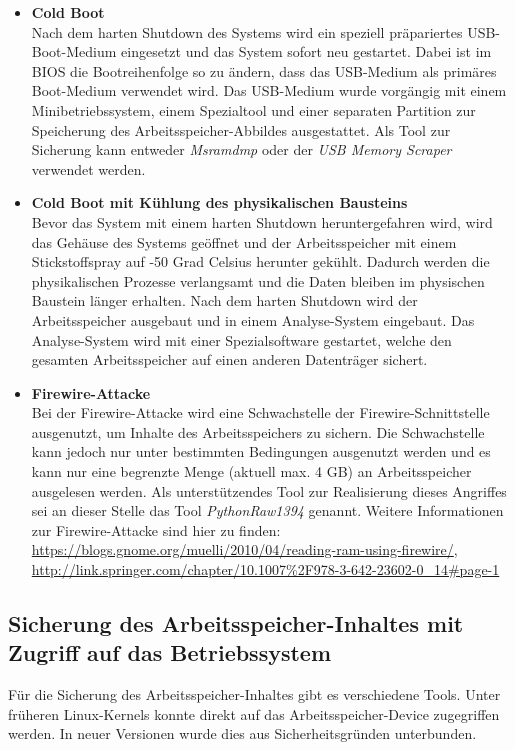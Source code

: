 \begin{itemize}
\item \textbf{Cold Boot}\\
Nach dem harten Shutdown des Systems wird ein speziell präpariertes USB-Boot-Medium eingesetzt und das System sofort neu gestartet. Dabei ist im BIOS die Bootreihenfolge so zu ändern, dass das USB-Medium als primäres Boot-Medium verwendet wird. Das USB-Medium wurde vorgängig mit einem Minibetriebssystem, einem Spezialtool und einer separaten Partition zur Speicherung des Arbeitsspeicher-Abbildes ausgestattet. Als Tool zur Sicherung kann entweder \textit{Msramdmp} oder der \textit{USB Memory Scraper} verwendet werden.

\item \textbf{Cold Boot mit Kühlung des physikalischen Bausteins}\\
Bevor das System mit einem harten Shutdown heruntergefahren wird, wird das Gehäuse des Systems geöffnet und der Arbeitsspeicher mit einem Stickstoffspray auf -50 Grad Celsius herunter gekühlt. Dadurch werden die physikalischen Prozesse verlangsamt und die Daten bleiben im physischen Baustein länger erhalten. Nach dem harten Shutdown wird der Arbeitsspeicher ausgebaut und in einem Analyse-System  eingebaut. Das Analyse-System wird mit einer Spezialsoftware gestartet, welche den gesamten Arbeitsspeicher auf einen anderen Datenträger sichert.

\item \textbf{Firewire-Attacke}\\
Bei der Firewire-Attacke wird eine Schwachstelle der Firewire-Schnittstelle ausgenutzt, um Inhalte des Arbeitsspeichers zu sichern. Die Schwachstelle kann jedoch nur unter bestimmten Bedingungen ausgenutzt werden und es kann nur eine begrenzte Menge (aktuell max. 4 GB) an Arbeitsspeicher ausgelesen werden. Als unterstützendes Tool zur Realisierung dieses Angriffes sei an dieser Stelle das Tool \textit{PythonRaw1394} genannt. Weitere Informationen zur Firewire-Attacke sind hier zu finden: \url{https://blogs.gnome.org/muelli/2010/04/reading-ram-using-firewire/}, \url{http://link.springer.com/chapter/10.1007%2F978-3-642-23602-0_14#page-1}
\end{itemize}

\subsection{Sicherung des Arbeitsspeicher-Inhaltes mit Zugriff auf das Betriebssystem}
Für die Sicherung des Arbeitsspeicher-Inhaltes gibt es verschiedene Tools. Unter früheren Linux-Kernels konnte direkt auf das Arbeitsspeicher-Device zugegriffen werden. In neuer Versionen wurde dies aus Sicherheitsgründen unterbunden.

